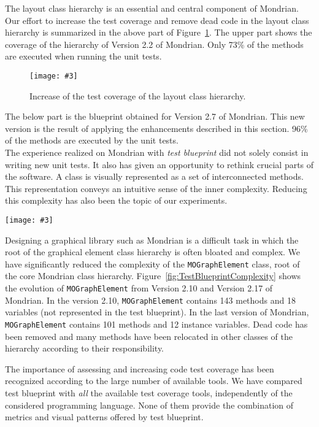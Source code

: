 \documentclass[runningheads]{llncs}
\newcommand{\ct}{\lstinline[backgroundcolor=\color{white},basicstyle=\footnotesize\ttfamily]}
\newcommand{\fig}[4]{
	\begin{figure}[#1]
		\centering
		\texttt{[image: \#3]}
		\caption{\label{fig:#3}#4}
	\end{figure}}
\newcommand{\largefig}[4]{
	\begin{figure*}[#1]
		\centering
		\texttt{[image: \#3]}
		\caption{\label{fig:#3}#4}
	\end{figure*}}
\newcommand{\figref}[1]{Figure~\ref{fig:#1}}
\newcommand{\myparagraph}[1]{\noindent \textbf{#1.}}
\begin{document}
The layout class hierarchy is an essential and central component of Mondrian.
Our effort to increase the test coverage and remove dead code in the layout class hierarchy is summarized in the above part of \figref{TestBlueprintEvolution}. The upper part shows the coverage of the hierarchy of Version 2.2 of Mondrian.  Only 73\% of the methods are executed when running the unit tests.

\fig{}{0.8}{TestBlueprintEvolution}{Increase of the test coverage of the layout class hierarchy.}

The below part is the blueprint obtained for Version 2.7 of Mondrian. This new version is the result of applying the enhancements described in this section. 96\% of the methods are executed by the unit tests. \\

The experience realized on Mondrian with \emph{test blueprint} did not solely consist in writing new unit tests. It also has given an opportunity to rethink crucial parts of the software. A class is visually represented as a set of interconnected methods. This representation conveys an intuitive sense of the inner complexity. Reducing this complexity has also been the topic of our experiments.

\largefig{}{1.0}{TestBlueprintComplexity}{Reduction of \ct{MOGraphElement} complexity.}

Designing a graphical library such as Mondrian is a difficult task in which the root of the graphical element class hierarchy is often bloated and complex. We have significantly reduced the complexity of the \ct{MOGraphElement} class, root of the core Mondrian class hierarchy. \figref{TestBlueprintComplexity} shows the evolution of \ct{MOGraphElement} from Version 2.10 and Version 2.17 of Mondrian. In the version 2.10, \ct{MOGraphElement} contains 143 methods and 18 variables (not represented in the test blueprint). In the last version of Mondrian, \ct{MOGraphElement} contains 101 methods and 12 instance variables. Dead code has been removed and many methods have been relocated in other classes of the hierarchy according to their responsibility.

The importance of assessing and increasing code test coverage has been recognized according to the large number of available tools. We have compared test blueprint with \emph{all} the available test coverage tools, independently of the considered programming language. None of them provide the combination of metrics and visual patterns offered by test blueprint.
\end{document}
